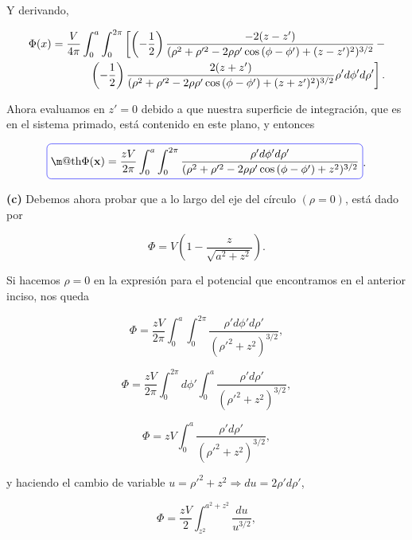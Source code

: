 \documentclass[a4paper,10pt]{article}
\makeatletter
\numberwithin{equation}{section}
\newcommand{\zerodel}{.\kern-\nulldelimiterspace}
\newcommand*{\boxcolor}{blue}
\renewcommand{\boxed}[1]{\textcolor{\boxcolor}{%
\tikz[baseline={([yshift=-1ex]current bounding box.center)}] \node [rectangle, minimum width=1ex,rounded corners,draw] {\normalcolor\m@th$\displaystyle#1$};}}
\makeatother
\begin{document}
Y derivando, 

\begin{align*}
 \Phi(x) = \frac{V}{4\pi}\int_0^a \int_0^{2\pi}\left[ \left(-\frac{1}{2}\right)
  \frac{-2(z-z')}{(\rho^2 + \rho'^2 - 2\rho\rho'\cos{(\phi - \phi')} + (z-z')^2)^{3/2}}\right\zerodel - \\
 \left\zerodel\left(-\frac{1}{2}\right)\frac{2(z+z')}{(\rho^2 + \rho'^2 - 2\rho\rho'\cos{(\phi - \phi')} + (z+z')^2)^{3/2}}
 \rho'd\phi'd\rho'\right].
\end{align*}

Ahora evaluamos en $z' = 0$ debido a que nuestra superficie de integración, que es 
en el sistema primado, está contenido en este plano, y entonces 

\begin{equation}
 \boxed{\Phi(\mathbf{x}) = \frac{zV}{2\pi}\int_0^a\int_0^{2\pi} 
 \frac{\rho' d\phi' d\rho'}{(\rho^2 + \rho'^2 - 2\rho\rho'\cos{(\phi - \phi')} + z^2)^{3/2}}}.
\end{equation}

\textbf{(c)} Debemos ahora probar que a lo largo del eje del círculo $(\rho = 0)$, 
está dado por 

\begin{equation}
 \Phi = V\left( 1 - \frac{z}{\sqrt{a^2 + z^2}}\right).
\end{equation}

Si hacemos $\rho = 0$ en la expresión para el potencial que encontramos en el 
anterior inciso, nos queda 

\begin{equation}
 \Phi = \frac{zV}{2\pi}\int_0^a\int_0^{2\pi} \frac{\rho'd\phi'd\rho'}{(\rho'^2 + 
 z^2)^{3/2}},
\end{equation}

\begin{equation}
  \Phi = \frac{zV}{2\pi}\int_0^{2\pi}d\phi'\int_0^a \frac{\rho'd\rho'}{(\rho'^2 + 
 z^2)^{3/2}},
\end{equation}

\begin{equation}
 \Phi = zV \int_0^a \frac{\rho'd\rho'}{(\rho'^2 +  z^2)^{3/2}},
\end{equation}

y haciendo el cambio de variable $u = \rho'^2 + z^2 \Rightarrow du = 2\rho'd\rho'$, 

\begin{equation}
 \Phi = \frac{zV}{2}\int_{z^2}^{a^2+z^2} \frac{du}{u^{3/2}},
\end{equation}
\end{document}
